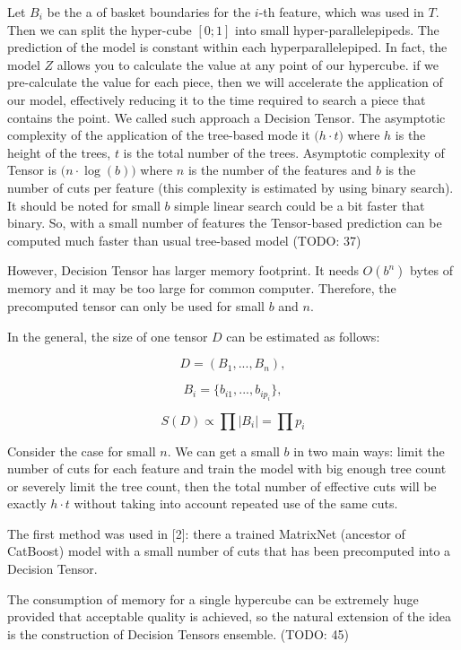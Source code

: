 \documentclass[a4paper]{jpconf}
\begin{document}
Let $B_i$ be the a of basket boundaries for the $i$-th feature, which was used in $T$. Then we can split the hyper-cube $[0;1]$ into small hyper-parallelepipeds. The prediction of the model is constant within each hyperparallelepiped. In fact, the model $Z$ allows you to calculate the value at any point of our hypercube. if we pre-calculate the value for each piece, then we will accelerate the application of our model, effectively reducing it to the time required to search a piece that contains the point. We called such approach a Decision Tensor. The asymptotic complexity of the application of the tree-based mode it $\mathcal(h\cdot t)$ where $h$ is the height of the trees, $t$ is the total number of the trees. Asymptotic complexity of Tensor is $\mathcal(n\cdot \log(b))$ where $n$ is the number of the features and $b$ is the number of cuts per feature (this complexity is estimated by using binary search). It should be noted for small $b$ simple linear search could be a bit faster that binary. So, with a small number of features the Tensor-based prediction can be computed much faster than usual tree-based model (TODO: 37)

However, Decision Tensor has larger memory footprint. It needs $O(b^n)$ bytes of memory and it may be too large for common computer. Therefore, the precomputed tensor can only be used for small $b$ and $n$.

In the general, the size of one tensor $D$ can be estimated as follows:

$$D = (B_{1}, ..., B_{n}),$$

$$B_{i} = \{b_{i1}, ..., b_{ip_{i}}\},$$

$$S(D) \propto \prod |B_{i}| = \prod p_i$$

Consider the case for small $n$. We can get a small $b$ in two main ways: limit the number of cuts for each feature and train the model with big enough tree count or severely limit the tree count, then the total number of effective cuts will be exactly $h\cdot t$ without taking into account repeated use of the same cuts.

The first method was used in [2]: there a trained MatrixNet (ancestor of CatBoost) model with a small number of cuts that has been precomputed into a Decision Tensor.

The consumption of memory for a single hypercube can be extremely huge provided that acceptable quality is achieved, so the natural extension of the idea is the construction of Decision Tensors ensemble. (TODO: 45)
\end{document}
